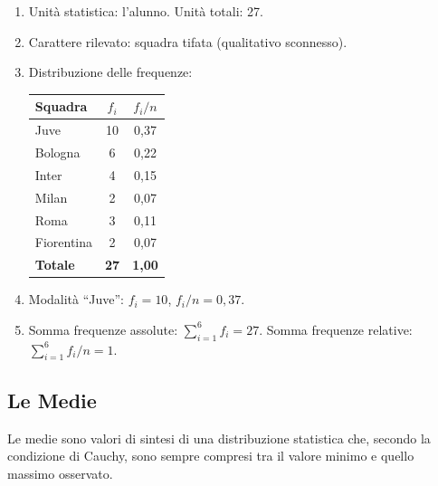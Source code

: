 \documentclass[a4paper,11pt]{article}
\begin{document}
\begin{enumerate}
    \item Unità statistica: l'alunno. Unità totali: 27.
    \item Carattere rilevato: squadra tifata (qualitativo sconnesso).
    \item Distribuzione delle frequenze:
    \begin{center}
    \begin{tabular}{lcc}
        \toprule
        \textbf{Squadra} & $f_i$ & $f_i/n$ \\
        \midrule
        Juve & 10 & 0,37 \\
        Bologna & 6 & 0,22 \\
        Inter & 4 & 0,15 \\
        Milan & 2 & 0,07 \\
        Roma & 3 & 0,11 \\
        Fiorentina & 2 & 0,07 \\
        \midrule
        \textbf{Totale} & \textbf{27} & \textbf{1,00} \\
        \bottomrule
    \end{tabular}
    \end{center}
    \item Modalità ``Juve'': $f_i = 10$, $f_i/n = 0,37$.
    \item Somma frequenze assolute: $\sum_{i=1}^{6} f_i = 27$. Somma frequenze relative: $\sum_{i=1}^{6} f_i/n = 1$.
\end{enumerate}

\subsection{Le Medie}
Le medie sono valori di sintesi di una distribuzione statistica che, secondo la condizione di Cauchy, sono sempre compresi tra il valore minimo e quello massimo osservato.
\end{document}
